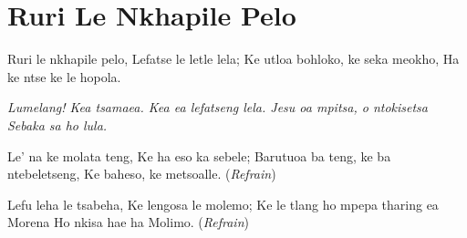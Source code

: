 \starttocol
\chapter{Ruri Le Nkhapile Pelo}
\nexttocol
\hfill{\it }
\stoptocol
\starttocol
\startlines
{\sc Ruri} le nkhapile pelo,
Lefatse le letle lela;
Ke utloa bohloko, ke seka meokho,
Ha ke ntse ke le hopola.

{\it  
Lumelang! Kea tsamaea.
Kea ea lefatseng lela.
Jesu oa mpitsa, o ntokisetsa
Sebaka sa ho lula.}

Le' na ke molata teng,
Ke ha eso ka sebele;
Barutuoa ba teng, ke ba ntebeletseng,
Ke baheso, ke metsoalle.
          \hfill({\it Refrain})~~~~~~~~~

Lefu leha le tsabeha,
Ke lengosa le molemo;
Ke le tlang ho mpepa tharing ea Morena
Ho nkisa hae ha Molimo.
          \hfill({\it Refrain})~~~~~~~~~
\stoplines
\nexttocol

\stoptocol
